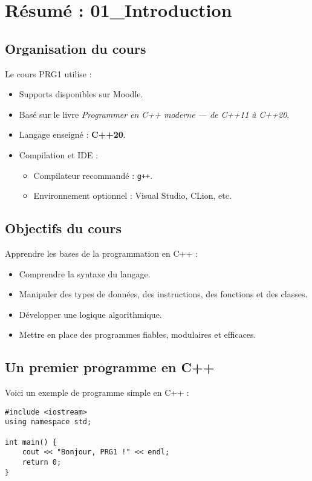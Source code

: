 \section{ Résumé : 01\_Introduction}

\subsection{ Organisation du cours}
Le cours PRG1 utilise :
\begin{itemize}
    \item Supports disponibles sur Moodle.
    \item Basé sur le livre \textit{Programmer en C++ moderne — de C++11 à C++20}.
    \item Langage enseigné : \textbf{C++20}.
    \item Compilation et IDE :
        \begin{itemize}
            \item Compilateur recommandé : \texttt{g++}.
            \item Environnement optionnel : Visual Studio, CLion, etc.
        \end{itemize}
\end{itemize}

\subsection{ Objectifs du cours}
Apprendre les bases de la programmation en C++ :
\begin{itemize}
    \item Comprendre la syntaxe du langage.
    \item Manipuler des types de données, des instructions, des fonctions et des classes.
    \item Développer une logique algorithmique.
    \item Mettre en place des programmes fiables, modulaires et efficaces.
\end{itemize}

\subsection{ Un premier programme en C++}

Voici un exemple de programme simple en C++ :
\begin{tcolorbox}[colframe=blue!50!black, colback=blue!5!white, title=Exemple de Premier Programme]
\begin{verbatim}
#include <iostream>
using namespace std;

int main() {
    cout << "Bonjour, PRG1 !" << endl;
    return 0;
}
\end{verbatim}
\end{tcolorbox}

